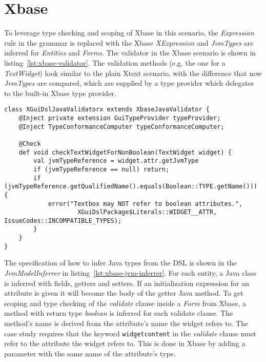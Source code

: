 \section{Xbase}
\label{sec:xbase}

To leverage type checking and scoping of Xbase in this scenario, the
\emph{Expression} rule in the grammar is replaced with the Xbase
\emph{XExpression} and \emph{JvmTypes} are inferred for \emph{Entities} and
\emph{Forms}.
The validator in the Xbase scenario is shown in
listing~\ref{lst:xbase-validator}. The validation methods (e.g. the one for a
\emph{TextWidget}) look similar to the plain Xtext scenario, with the difference
that now \emph{JvmTypes} are compared, which are supplied by a type provider
which delegates to the built-in Xbase type provider.


\begin{lstlisting}[language=xtend,float=tb,label=lst:xbase-validator,caption=Xtext
validator in the Xbase scenario.] 
class XGuiDslJavaValidatorx extends XbaseJavaValidator {
	@Inject private extension GuiTypeProvider typeProvider;
	@Inject TypeConformanceComputer typeConformanceComputer;

	@Check
	def void checkTextWidgetForNonBoolean(TextWidget widget) {
		val jvmTypeReference = widget.attr.getJvmType
		if (jvmTypeReference == null) return;
		if (jvmTypeReference.getQualifiedName().equals(Boolean::TYPE.getName())) {
			error("Textbox may NOT refer to boolean attributes.",
					XGuiDslPackage$Literals::WIDGET__ATTR, IssueCodes::INCOMPATIBLE_TYPES);
		}
	}
}
\end{lstlisting}

The specification of how to infer Java types from the DSL is shown in the
\emph{JvmModelInferrer} in listing~\ref{lst:xbase-jvm-inferrer}.  For each
entity, a Java class is inferred with fields, getters and setters.
If an initialization expression for an attribute is given it will become the
body of the getter Java method.  To get scoping and type checking of the
\emph{validate} clause inside a \emph{Form} from Xbase, a method with return type \emph{boolean} is inferred for
each validate clause. The method's name is derived from the attribute's name the
widget refers to. The case study requires that the keyword \verb|widgetcontent|
in the \emph{validate} clause must refer to the attribute the widget refers to.
This is done in Xbase by adding a parameter with the same name of the
attribute's type. 

